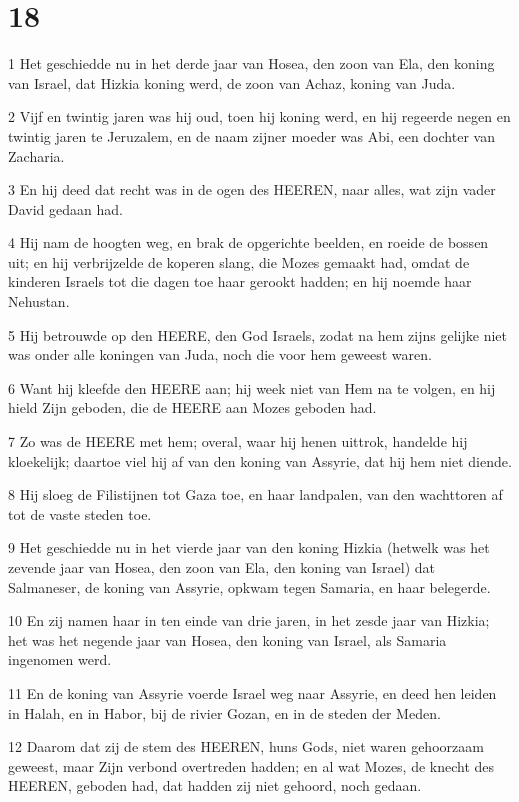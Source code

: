 \chapter{18}

\par 1 Het geschiedde nu in het derde jaar van Hosea, den zoon van Ela, den koning van Israel, dat Hizkia koning werd, de zoon van Achaz, koning van Juda.
\par 2 Vijf en twintig jaren was hij oud, toen hij koning werd, en hij regeerde negen en twintig jaren te Jeruzalem, en de naam zijner moeder was Abi, een dochter van Zacharia.
\par 3 En hij deed dat recht was in de ogen des HEEREN, naar alles, wat zijn vader David gedaan had.
\par 4 Hij nam de hoogten weg, en brak de opgerichte beelden, en roeide de bossen uit; en hij verbrijzelde de koperen slang, die Mozes gemaakt had, omdat de kinderen Israels tot die dagen toe haar gerookt hadden; en hij noemde haar Nehustan.
\par 5 Hij betrouwde op den HEERE, den God Israels, zodat na hem zijns gelijke niet was onder alle koningen van Juda, noch die voor hem geweest waren.
\par 6 Want hij kleefde den HEERE aan; hij week niet van Hem na te volgen, en hij hield Zijn geboden, die de HEERE aan Mozes geboden had.
\par 7 Zo was de HEERE met hem; overal, waar hij henen uittrok, handelde hij kloekelijk; daartoe viel hij af van den koning van Assyrie, dat hij hem niet diende.
\par 8 Hij sloeg de Filistijnen tot Gaza toe, en haar landpalen, van den wachttoren af tot de vaste steden toe.
\par 9 Het geschiedde nu in het vierde jaar van den koning Hizkia (hetwelk was het zevende jaar van Hosea, den zoon van Ela, den koning van Israel) dat Salmaneser, de koning van Assyrie, opkwam tegen Samaria, en haar belegerde.
\par 10 En zij namen haar in ten einde van drie jaren, in het zesde jaar van Hizkia; het was het negende jaar van Hosea, den koning van Israel, als Samaria ingenomen werd.
\par 11 En de koning van Assyrie voerde Israel weg naar Assyrie, en deed hen leiden in Halah, en in Habor, bij de rivier Gozan, en in de steden der Meden.
\par 12 Daarom dat zij de stem des HEEREN, huns Gods, niet waren gehoorzaam geweest, maar Zijn verbond overtreden hadden; en al wat Mozes, de knecht des HEEREN, geboden had, dat hadden zij niet gehoord, noch gedaan.
